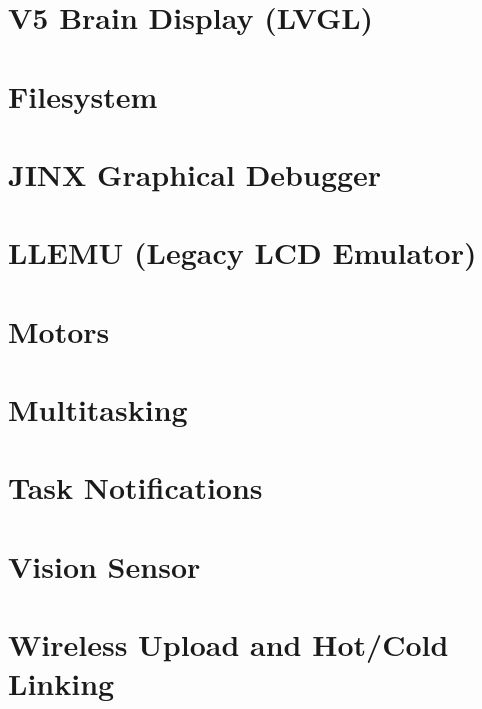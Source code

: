 \documentclass[twoside]{book}
\newcommand{\+}{\discretionary{\mbox{\scriptsize$\hookleftarrow$}}{}{}}
\begin{document}
\chapter{V5 Brain Display (L\+V\+GL)}
\label{md_docs_tutorials_topical_display}

\chapter{Filesystem}
\label{md_docs_tutorials_topical_filesystem}

\chapter{J\+I\+NX Graphical Debugger}
\label{md_docs_tutorials_topical_jinx}

\chapter{L\+L\+E\+MU (Legacy L\+CD Emulator)}
\label{md_docs_tutorials_topical_llemu}

\chapter{Motors}
\label{md_docs_tutorials_topical_motors}

\chapter{Multitasking}
\label{md_docs_tutorials_topical_multitasking}

\chapter{Task Notifications}
\label{md_docs_tutorials_topical_notifications}

\chapter{Vision Sensor}
\label{md_docs_tutorials_topical_vision}

\chapter{Wireless Upload and Hot/\+Cold Linking}
\label{md_docs_tutorials_topical_wireless-upload}

\end{document}
